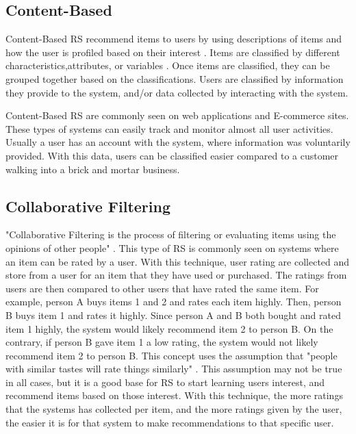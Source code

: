 \documentclass[sigconf]{acmart}
\begin{document}
\subsection{Content-Based}
Content-Based RS recommend items to users by using descriptions of items and how the user is profiled based on their interest \cite {Pazzani2007}. Items are classified by different characteristics,attributes, or variables \cite{Pazzani2007}. Once items are classified, they can be grouped together based on the classifications. Users are classified by information they provide to the system, and/or data collected by interacting with the system. 

Content-Based RS are commonly seen on web applications and E-commerce sites. These types of systems can easily track and monitor almost all user activities. Usually a user has an account with the system, where information was voluntarily provided. With this data, users can be classified easier compared to a customer walking into a brick and mortar business.

\subsection{Collaborative Filtering}
"Collaborative Filtering is the process of filtering or evaluating items using the opinions of other people" \cite{Schafer2007}. This type of RS is commonly seen on systems where an item can be rated by a user. With this technique, user rating are collected and store from a user for an item that they have used or purchased. The ratings from users are then compared to other users that have rated the same item. For example, person A buys items 1 and 2 and rates each item highly. Then, person B buys item 1 and rates it highly. Since person A and B both bought and rated item 1 highly, the system would likely recommend item 2 to person B. On the contrary, if person B gave item 1 a low rating, the system would not likely recommend item 2 to person B. This concept uses the assumption that "people with similar tastes will rate things similarly" \cite{Schafer2007}. This assumption may not be true in all cases, but it is a good base for RS to start learning users interest, and recommend items based on those interest. With this technique, the more ratings that the systems has collected per item, and the more ratings given by the user, the easier it is for that system to make recommendations to that specific user.
\end{document}
